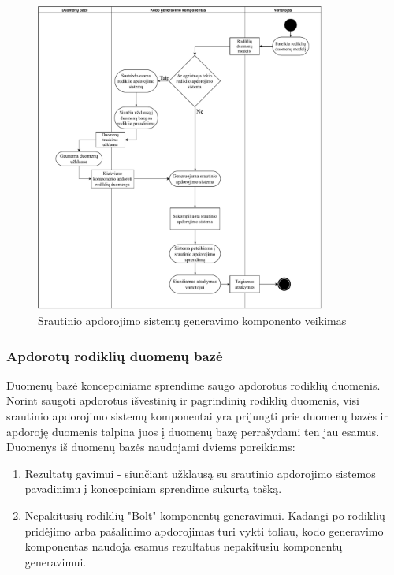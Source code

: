 \documentclass{VUMIFPSbakalaurinis}
\begin{document}
\begin{figure}[H]
    \centering
    \includegraphics[width=0.85\textwidth]{img/generation-flow.pdf}
    \caption{Srautinio apdorojimo sistemų generavimo komponento veikimas}
    \label{img:generation-flow}
\end{figure}

\subsubsection{Apdorotų rodiklių duomenų bazė}

Duomenų bazė koncepciniame sprendime saugo apdorotus rodiklių duomenis. Norint saugoti apdorotus išvestinių ir pagrindinių rodiklių duomenis, visi srautinio apdorojimo sistemų komponentai yra prijungti prie duomenų bazės ir apdoroję duomenis talpina juos į duomenų bazę perrašydami ten jau esamus. Duomenys iš duomenų bazės naudojami dviems poreikiams: 
\begin{enumerate}
    \item Rezultatų gavimui - siunčiant užklausą su srautinio apdorojimo sistemos pavadinimu į koncepciniam sprendime sukurtą tašką. 
    \item Nepakitusių rodiklių "Bolt" komponentų generavimui. Kadangi po rodiklių pridėjimo arba pašalinimo apdorojimas turi vykti toliau, kodo generavimo komponentas naudoja esamus rezultatus nepakitusiu komponentų generavimui.   
\end{enumerate}  
\end{document}
